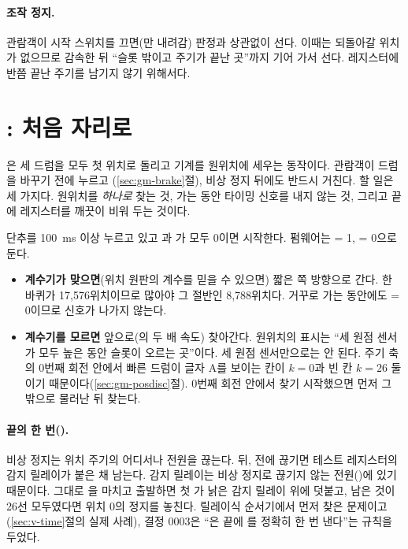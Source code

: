 \paragraph{조작 정지.} 관람객이 시작 스위치를 끄면(만 내려감) 판정과 상관없이 선다. 이때는 되돌아갈 위치가 없으므로
감속한 뒤 ``슬롯 밖이고 주기가 끝난 곳''까지 기어 가서 선다. 레지스터에 반쯤 끝난 주기를 남기지 않기 위해서다.

\section{\texorpdfstring{}{HOME}: 처음 자리로}\label{sec:gk-home}

\Why {}은 세 드럼을 모두 첫 위치로 돌리고 기계를 원위치에 세우는 동작이다. 관람객이 드럼을 바꾸기 전에 누르고
(\ref{sec:gm-brake}절), 비상 정지 뒤에도 반드시 거친다. 할 일은 세 가지다. 원위치를 \emph{하나로} 찾는 것, 가는 동안 타이밍
신호를 내지 않는 것, 그리고 끝에 레지스터를 깨끗이 비워 두는 것이다.

\Ours {} 단추를 100~ms 이상 누르고 있고 과 가 모두 0이면 시작한다. 펌웨어는
 = 1,  = 0으로 둔다.

\begin{itemize}
\item \textbf{계수기가 맞으면}(위치 원판의 계수를 믿을 수 있으면) 짧은 쪽 방향으로 간다. 한 바퀴가 17,576위치이므로 많아야
그 절반인 8,788위치다. 거꾸로 가는 동안에도  = 0이므로 신호가 나가지 않는다.
\item \textbf{계수기를 모르면} 앞으로(의 두 배 속도) 찾아간다. 원위치의 표시는 ``세 원점 센서가 모두 높은 동안
 슬롯이 오르는 곳''이다. 세 원점 센서만으로는 안 된다. 주기 축의 0번째 회전 안에서 빠른 드럼이 글자 A를 보이는
칸이 $k = 0$과 빈 칸 $k = 26$ 둘이기 때문이다(\ref{sec:gm-posdisc}절). 0번째 회전 안에서 찾기 시작했으면 먼저 그 밖으로
물러난 뒤 찾는다.
\end{itemize}

\paragraph{끝의  한 번().} 비상 정지는 위치 주기의 어디서나 전원을 끊는다.  뒤, 
전에 끊기면 테스트 레지스터의 감지 릴레이가 붙은 채 남는다. 감지 릴레이는 비상 정지로 끊기지 않는 전원()에 있기
때문이다. 그대로 을 마치고 출발하면 첫 가 낡은 감지 릴레이 위에 덧붙고, 남은 것이 26선 모두였다면
위치 0의 정지를 놓친다. 릴레이식 순서기에서 먼저 찾은 문제이고(\ref{sec:v-time}절의 실제 사례), 결정 0003은 ``은
끝에 를 정확히 한 번 낸다''는 규칙을 두었다.

